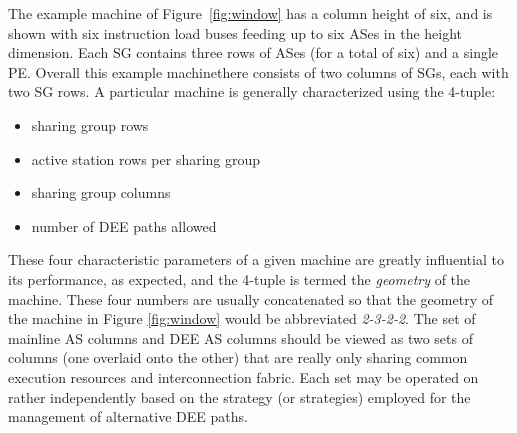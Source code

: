 \documentclass{book}
\begin{document}
The example machine of Figure~\ref{fig:window} has a column height of
six, and is shown with six instruction load buses feeding up to
six ASes in the height dimension.
Each SG contains three rows of ASes
(for a total of six) and a single PE.
Overall this example machinethere
consists of two columns of SGs, each with two SG rows.
A particular machine is generally characterized using the 4-tuple: 
%
\begin{itemize}
\item{sharing group rows}
\vspace{-0.10in}
\item{active station rows per sharing group}
\vspace{-0.10in}
\item{sharing group columns}
\vspace{-0.10in}
\item{number of DEE paths allowed}
\end{itemize}   
%
These four characteristic parameters of a given machine
are greatly influential to its performance, as expected,
and the 4-tuple is termed the \textit{geometry} 
of the machine.
These four numbers are usually concatenated
so that the geometry of the machine in Figure \ref{fig:window}
would be abbreviated {\em 2-3-2-2}.
The set of mainline AS columns and DEE AS columns should be
viewed as two sets of columns (one overlaid onto the other)
that are really only sharing
common execution resources and interconnection fabric.
Each set may be operated on rather independently based on
the strategy (or strategies) employed for the management of
alternative DEE paths.
\end{document}
